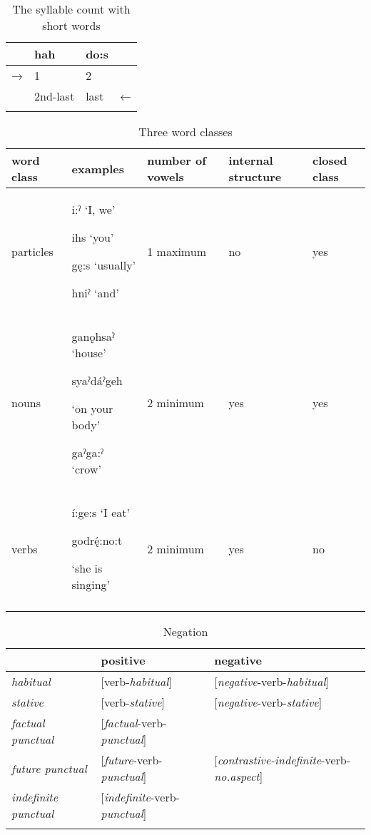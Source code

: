 \begin{table}
\caption{The syllable count with short words}
\label{tab:1:shortwdsyll}
\begin{tabularx}{\textwidth}{XXXX} 
\lsptoprule
& hah & do:s & \\
\midrule
 → & 1 & 2 & \\
& 2nd-last & last & ←\\
\lspbottomrule
\end{tabularx}
\end{table}


\lipsum[1-1]


\begin{table}
\caption{Three word classes}
\label{tab:1:threewordclass}
\scriptsize{
\begin{tabularx}{\textwidth}{XXXXX}
\lsptoprule
word class & examples & number of vowels & internal structure & closed class\\
\midrule
particles & i:ˀ  ‘I, we’

ihs ‘you’

gę:s ‘usually’

hniˀ  ‘and’ & 1 maximum & no & yes\\
nouns & ganǫhsaˀ ‘house’

syaˀdáˀgeh 

‘on your body’

gaˀga:ˀ ‘crow’ & 2 minimum & yes & yes\\
verbs & í:ge:s ‘I eat’

godr\'{ę}:no:t 

‘she is singing’ & 2 minimum & yes & no\\
\lspbottomrule
\end{tabularx}}
\end{table}


\lipsum[1-1]

\begin{table}
\caption{Negation}
\label{tab:1:negation}
\scriptsize{
\begin{tabularx}{\textwidth}{XXX} 
\lsptoprule
& positive & negative\\
\midrule
\textit{habitual} & [verb-\textit{habitual}] & [\textit{negative}{}-verb-\textit{habitual}]\\
\textit{stative} & [verb-\textit{stative}] & [\textit{negative}{}-verb-\textit{stative}]\\
\textit{factual punctual} & [\textit{factual}{}-verb-\textit{punctual}] & \\
\textit{future punctual} & [\textit{future}{}-verb-\textit{punctual}] & [\textit{contrastive-indefinite}{}-verb-\textit{no.aspect}]\\
\textit{indefinite punctual} & [\textit{indefinite}{}-verb-\textit{punctual}] & \\
\lspbottomrule
\end{tabularx}}
\end{table}


